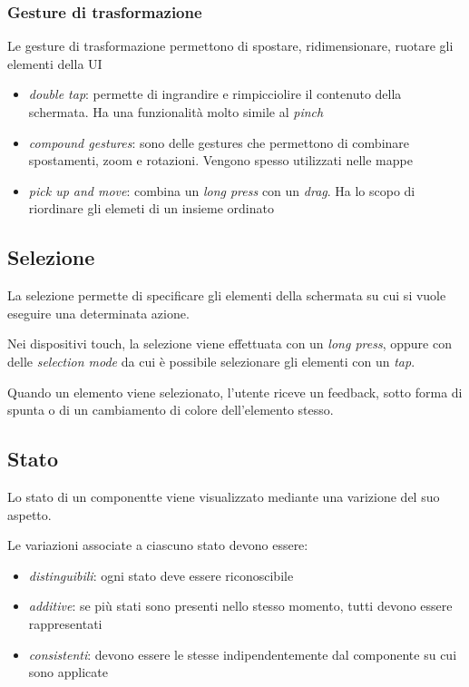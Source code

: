 \documentclass[12pt, a4paper]{report}
\begin{document}
			\subsubsection{Gesture di trasformazione}
			Le gesture di trasformazione permettono di spostare, ridimensionare, ruotare gli elementi della UI
			\begin{itemize}
				\item \textit{double tap}: permette di ingrandire e rimpicciolire il contenuto della schermata. Ha una funzionalità molto simile al \textit{pinch}
				\item \textit{compound gestures}: sono delle gestures che permettono di combinare spostamenti, zoom e rotazioni. Vengono spesso utilizzati nelle mappe
				\item \textit{pick up and move}: combina un \textit{long press} con un \textit{drag}. Ha lo scopo di riordinare gli elemeti di un insieme ordinato
			\end{itemize}

		\subsection{Selezione}
		La selezione permette di specificare gli elementi della schermata su cui si vuole eseguire una determinata azione.

		Nei dispositivi touch, la selezione viene effettuata con un \textit{long press}, oppure con delle \textit{selection mode} da cui è possibile selezionare gli elementi con un \textit{tap}.
		
		Quando un elemento viene selezionato, l'utente riceve un feedback, sotto forma di spunta o di un cambiamento di colore dell'elemento stesso.
		
		\subsection{Stato}
		Lo stato di un componentte viene visualizzato mediante una varizione del suo aspetto.
		
		Le variazioni associate a ciascuno stato devono essere:
		\begin{itemize}
			\item \textit{distinguibili}: ogni stato deve essere riconoscibile
			\item \textit{additive}: se più stati sono presenti nello stesso momento, tutti devono essere rappresentati
			\item \textit{consistenti}: devono essere le stesse indipendentemente dal componente su cui sono applicate
		\end{itemize}
		
\end{document}
